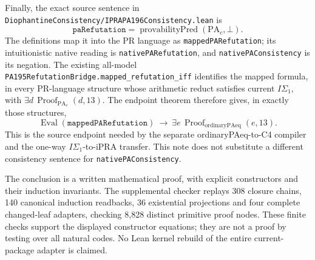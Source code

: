 Finally, the exact source sentence in
\texttt{DiophantineConsistency/IPRAPA196Consistency.lean} is
\[
 \texttt{paRefutation}
 =\operatorname{provabilityPred}(\mathrm{PA}_c,\bot).
\]
The definitions map it into the PR language as
\texttt{mappedPARefutation}; its intuitionistic native reading is
\texttt{nativePARefutation}, and
\texttt{nativePAConsistency} is its negation.
The existing all-model
\texttt{PA195RefutationBridge.mapped\_refutation\_iff}
identifies the mapped formula, in every PR-language structure whose
arithmetic reduct satisfies current $I\Sigma_1$, with
$\exists d\,\operatorname{Proof}_{\mathrm{PA}_c}(d,13)$.
The endpoint theorem therefore gives, in exactly those structures,
\[
 \operatorname{Eval}(\texttt{mappedPARefutation})
 \ \longrightarrow\
 \exists e\,\operatorname{Proof}_{\mathrm{ordinaryPAeq}}(e,13).
\]
This is the source endpoint needed by the separate ordinaryPAeq-to-C4
compiler and the one-way $I\Sigma_1$-to-iPRA transfer.  This note does
not substitute a different consistency sentence for
\texttt{nativePAConsistency}.

The conclusion is a written mathematical proof, with explicit
constructors and their induction invariants.  The supplemental checker
replays 308 closure chains, 140 canonical induction readbacks,
36 existential projections and four complete changed-leaf adapters,
checking 8,828 distinct primitive proof nodes.  These finite checks
support the displayed constructor equations; they are not a proof
by testing over all natural codes.  No Lean kernel rebuild of the
entire current-package adapter is claimed.
